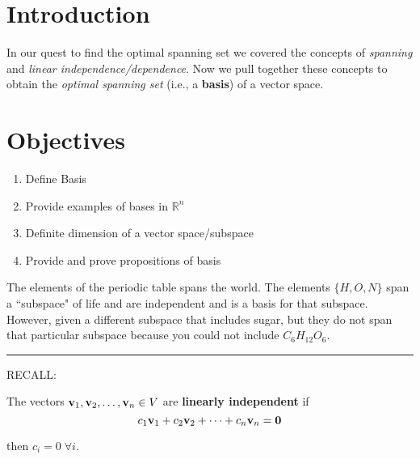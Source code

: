 %
\section*{Introduction}

In our quest to find the optimal spanning set we covered the concepts of \textit{spanning} and \textit{linear independence/dependence}.   Now we pull together these concepts to obtain the \textit{optimal spanning set} (i.e., a \textbf{basis}) of a vector space. 

\section*{Objectives}
\begin{enumerate}
	\item Define Basis
	\item Provide  examples of bases in $\mathbb{R}^n$
	\item Definite dimension of a vector space/subspace
	\item Provide and prove propositions of basis 
    
\end{enumerate}





The elements of the periodic table spans the world.  The elements $\{H, O, N \}$ span a ``subspace" of life and are independent and is a basis for that subspace.  However, given a different subspace that includes sugar, but they do not span that particular subspace because you could not include $C_6H_{12}O_6$. 


\rule[0.01in]{\textwidth}{0.0025in}




 
 RECALL:
 
 



\begin{tcolorbox}[colback=white!10!,colframe=gray!15!]
	\begin{definition}
		The vectors ${\bf v}_1, {\bf v}_2,  \dots, {\bf v}_n \in V$ are \textbf{linearly independent} if 
\[  c_1 {\bf v}_1 + c_2 {\bf v}_2 + \cdots + c_n {\bf v}_n = {\bf 0} \]

then $c_i = 0 \; \forall i$.


	\end{definition}
	 
\end{tcolorbox}






